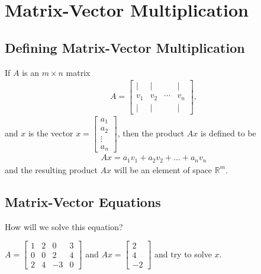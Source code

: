 \documentclass{package/notes}
\begin{document}
\section{Matrix-Vector Multiplication}
\subsection{Defining Matrix-Vector Multiplication}
If $A$ is an $m\times n$ matrix
\begin{align*}
    A = \left[ \begin{array}{cccc} | &  | & &  | \\ v_1 &  v_2 &  \cdots &  v_ n \\ | &  | & &  | \end{array} \right],
\end{align*}
and $x$ is the vector $x = \left[\begin{array}{c} a_1 \\ a_2 \\ \vdots \\ a_ n \end{array} \right]$, then the product $Ax$ is defined to be 
\begin{align*}
    Ax = a_1 v_1 + a_2 v_2 + \ldots + a_ n v_ n
\end{align*}
and the resulting product $Ax$ will be an element of space $\mathbb{R}^m$.
\subsection{Matrix-Vector Equations}
\begin{problem}
How will we solve this equation?

$A = \left[ \begin{array}{cccc} 1 &  2 & 0& 3 \\ 0 &  0 &  2 &  4 \\ 2 &  4 &-3 &  0 \end{array} \right]
$ and $Ax=\left[\begin{array}{c} 2 \\ 4 \\ -2 \end{array} \right]$ and try to solve $x$.
\end{problem}
\end{document}
